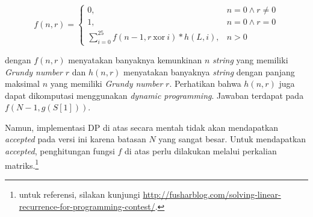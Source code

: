 \documentclass[../main_editorial.tex]{subfiles} %
\begin{document}
$$
f(n, r) = 
\begin{cases}
0, & n = 0 \land r \neq 0 \\
1, & n = 0 \land r = 0 \\
\displaystyle \sum_{i=0}^{25}f(n - 1, r\ \mathrm{xor}\ i) * h(L, i), & n > 0
\end{cases}
$$

dengan $ f(n, r) $ menyatakan banyaknya kemunkinan $ n $ \textit{string} yang memiliki \textit{Grundy number} $ r $ dan $ h(n, r) $ menyatakan banyaknya \textit{string} dengan panjang maksimal $ n $ yang memiliki \textit{Grundy number} $ r $. Perhatikan bahwa $ h(n, r) $ juga dapat dikomputasi menggunakan \textit{dynamic programming}. Jawaban terdapat pada $ f(N - 1, g(S[1])) $.

Namun, implementasi DP di atas secara mentah tidak akan mendapatkan \textit{accepted} pada versi ini karena batasan $ N $ yang sangat besar. Untuk mendapatkan \textit{accepted}, penghitungan fungsi $ f $ di atas perlu dilakukan melalui perkalian matriks.\footnote{untuk referensi, silakan kunjungi \url{http://fusharblog.com/solving-linear-recurrence-for-programming-contest/}.}
\end{document}
